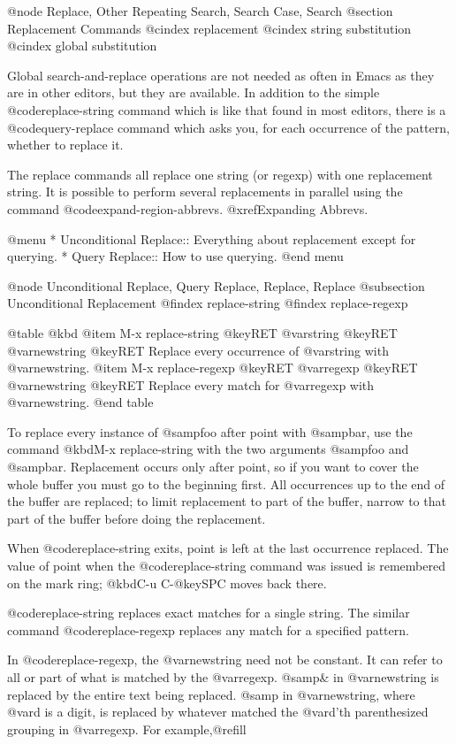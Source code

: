 {{{{{{{{{{{{{{{{{@node Replace, Other Repeating Search, Search Case, Search
@section Replacement Commands
@cindex replacement
@cindex string substitution
@cindex global substitution

  Global search-and-replace operations are not needed as often in Emacs as
they are in other editors, but they are available.  In addition to the
simple @code{replace-string} command which is like that found in most
editors, there is a @code{query-replace} command which asks you, for each
occurrence of the pattern, whether to replace it.

  The replace commands all replace one string (or regexp) with one
replacement string.  It is possible to perform several replacements in
parallel using the command @code{expand-region-abbrevs}.  @xref{Expanding
Abbrevs}.

@menu
* Unconditional Replace::  Everything about replacement except for querying.
* Query Replace::          How to use querying.
@end menu

@node Unconditional Replace, Query Replace, Replace, Replace
@subsection Unconditional Replacement
@findex replace-string
@findex replace-regexp

@table @kbd
@item M-x replace-string @key{RET} @var{string} @key{RET} @var{newstring} @key{RET}
Replace every occurrence of @var{string} with @var{newstring}.
@item M-x replace-regexp @key{RET} @var{regexp} @key{RET} @var{newstring} @key{RET}
Replace every match for @var{regexp} with @var{newstring}.
@end table

  To replace every instance of @samp{foo} after point with @samp{bar}, use
the command @kbd{M-x replace-string} with the two arguments @samp{foo} and
@samp{bar}.  Replacement occurs only after point, so if you want to cover
the whole buffer you must go to the beginning first.  All occurrences up to
the end of the buffer are replaced; to limit replacement to part of the
buffer, narrow to that part of the buffer before doing the replacement.

  When @code{replace-string} exits, point is left at the last occurrence
replaced.  The value of point when the @code{replace-string} command was
issued is remembered on the mark ring; @kbd{C-u C-@key{SPC}} moves back
there.

  @code{replace-string} replaces exact matches for a single string.  The
similar command @code{replace-regexp} replaces any match for a specified
pattern.

  In @code{replace-regexp}, the @var{newstring} need not be constant.  It
can refer to all or part of what is matched by the @var{regexp}.  @samp{\&}
in @var{newstring} is replaced by the entire text being replaced.
@samp{} in @var{newstring}, where @var{d} is a digit, is replaced
by whatever matched the @var{d}'th parenthesized grouping in @var{regexp}.
For example,@refill

}}}}}}}}}}}}}}}}}
